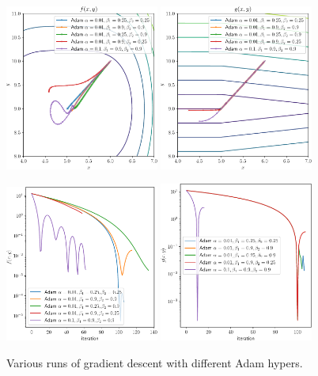 \begin{figure}
  \begin{center}
    \includegraphics[width=0.45\textwidth]{fig/adam-step-plot-f.pdf}
    \includegraphics[width=0.45\textwidth]{fig/adam-step-plot-g.pdf}

    \includegraphics[width=0.45\textwidth]{fig/adam-iterations-f.pdf}
    \includegraphics[width=0.45\textwidth]{fig/adam-iterations-g.pdf}
  \end{center}
  \caption{Various runs of gradient descent with different Adam hypers.}\label{fig:adam-step-plots}
\end{figure}

